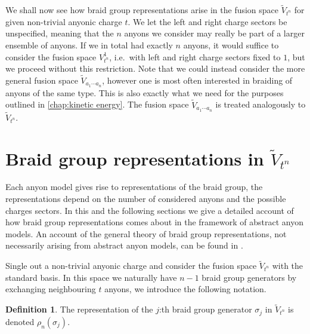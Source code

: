 \documentclass[a4paper,10pt,oneside]{book}
\theoremstyle{plain}
\theoremstyle{definition}
\newtheorem{definition}{Definition}[section]
\theoremstyle{remark}
\begin{document}
We shall now see how braid group representations arise in the fusion space $\widetilde{V}_{t^n}$ for given non-trivial anyonic charge $t$. We let the left and right charge sectors be unspecified, meaning that the $n$ anyons we consider may really be part of a larger ensemble of anyons. If we in total had exactly $n$ anyons, it would suffice to consider the fusion space $V_{t^n}^1$, i.e.\ with left and right charge sectors fixed to $1$, but we proceed without this restriction. Note that we could instead consider the more general fusion space $\widetilde{V}_{a_1 \cdots a_n}$, however one is most often interested in braiding of anyons of the same type. This is also exactly what we need for the purposes outlined in \cref{chap:kinetic energy}. The fusion space $\widetilde{V}_{a_1 \cdots a_n}$ is treated analogously to $\widetilde{V}_{t^n}$.






















\section{Braid group representations in \texorpdfstring{$\widetilde{V}_{t^n}$}{V\~_(τⁿ)}}\label{sec:anyonic braid representations in fusion space}

Each anyon model gives rise to representations of the braid group, the representations depend on the number of considered anyons and the possible charges sectors. In this and the following sections we give a detailed account of how braid group representations comes about in the framework of abstract anyon models. An account of the general theory of braid group representations, not necessarily arising from abstract anyon models, can be found in \cite{oskar}.

Single out a non-trivial anyonic charge and consider the fusion space $\widetilde{V}_{t^n}$ with the standard basis. In this space we naturally have $n-1$ braid group generators by exchanging neighbouring $t$ anyons, we introduce the following notation.

\begin{definition}\label{def:rho_n sigma_j}
  The representation of the $j$:th braid group generator $σ_j$ in $\widetilde{V}_{t^n}$ is denoted $ρ_n(σ_j)$.
\end{definition}
\end{document}
